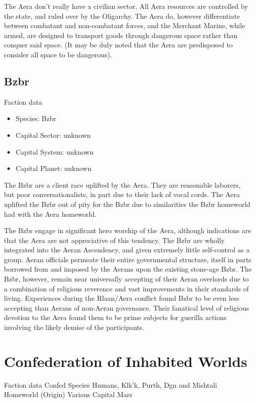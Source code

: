 The Aera don't really have a civilian sector. All Aera resources are
controlled by the state, and ruled over by the Oligarchy. The Aera do,
however differentiate between combatant and non-combatant forces, and
the Merchant Marine, while armed, are designed to transport goods
through dangerous space rather than conquer said space. (It may be
duly noted that the Aera are predisposed to consider all space to be
dangerous).

\subsection{Bzbr}

Faction data
\begin{itemize}
\item Species: Bzbr
\item Capital Sector: unknown
\item Capital System: unknown
\item Capital Planet: unknown
\end{itemize}

The Bzbr are a client race uplifted by the Aera. They are reasonable
laborers, but poor conversationalists, in part due to their lack of
vocal cords.  The Aera uplifted the Bzbr out of pity for the Bzbr due
to similarities the Bzbr homeworld had with the Aera homeworld.

The Bzbr engage in significant hero worship of the Aera, although
indications are that the Aera are not appreciative of this
tendency. The Bzbr are wholly integrated into the Aeran Ascendency,
and given extremely little self-control as a group. Aeran officials
permeate their entire governmental structure, itself in parts borrowed
from and imposed by the Aerans upon the existing stone-age Bzbr. The
Bzbr, however, remain near universally accepting of their Aeran
overlords due to a combination of religious reverence and vast
improvements in their standards of living. Experiences during the
Rlaan/Aera conflict found Bzbr to be even less accepting than Aerans
of non-Aeran governance. Their fanatical level of religious devotion
to the Aera found them to be prime subjects for guerilla actions
involving the likely demise of the participants.


\section{Confederation of Inhabited Worlds}

Faction data 
Confed 
Species 	Humans, Klk'k, Purth, Dgn and Mishtali 
Homeworld (Origin) 	Various 
Capital 	Mars 

